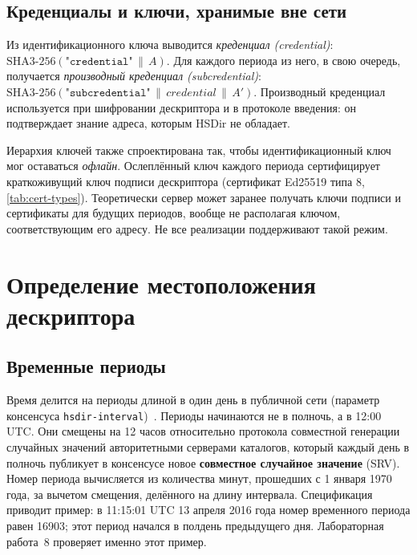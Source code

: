 \subsection{Креденциалы и ключи, хранимые вне сети}

\begin{sloppypar}
Из идентификационного ключа выводится \emph{креденциал (credential)}: $\mathrm{SHA3\text{-}256}(\texttt{"credential"} \,\|\allowbreak\, A)$. Для каждого периода из него, в свою очередь, получается \emph{производный креденциал (subcredential)}: $\mathrm{SHA3\text{-}256}(\texttt{"subcredential"} \,\|\allowbreak\, \mathit{credential} \,\|\allowbreak\, A')$. Производный креденциал используется при шифровании дескриптора и в протоколе введения: он подтверждает знание адреса, которым HSDir не обладает.
\end{sloppypar}

Иерархия ключей также спроектирована так, чтобы идентификационный ключ мог оставаться \emph{офлайн}. Ослеплённый ключ каждого периода сертифицирует краткоживущий ключ подписи дескриптора (сертификат Ed25519 типа 8, \cref{tab:cert-types}). Теоретически сервер может заранее получать ключи подписи и сертификаты для будущих периодов, вообще не располагая ключом, соответствующим его адресу. Не все реализации поддерживают такой режим.

\section{Определение местоположения дескриптора}\label{sec:os-hsdir}

\subsection{Временные периоды}

Время делится на периоды длиной в один день в публичной сети (параметр консенсуса \texttt{hsdir-interval})~. Периоды начинаются не в полночь, а в 12:00 UTC. Они смещены на 12 часов относительно протокола совместной генерации случайных значений авторитетными серверами каталогов, который каждый день в полночь публикует в консенсусе новое \textbf{совместное случайное значение} (SRV). Номер периода вычисляется из количества минут, прошедших с 1 января 1970 года, за вычетом смещения, делённого на длину интервала. Спецификация приводит пример: в 11:15:01 UTC 13 апреля 2016 года номер временного периода равен 16903; этот период начался в полдень предыдущего дня. Лабораторная работа~8 проверяет именно этот пример.

